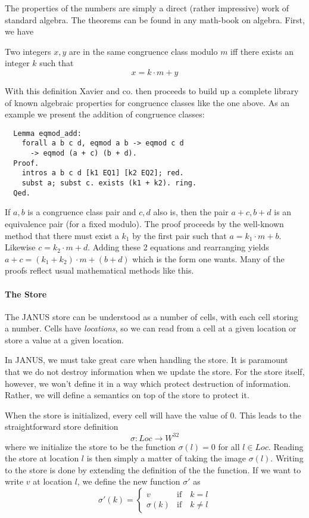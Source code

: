 The properties of the numbers are simply a direct (rather impressive)
work of standard algebra. The theorems can be found in any math-book
on algebra. First, we have
\begin{defn}
  Two integers $x, y$ are in the same congruence class modulo $m$ iff
  there exists an integer $k$ such that
  \begin{equation*}
    x = k \cdot m + y
  \end{equation*}
\end{defn}
With this definition Xavier and co. then proceeds to build up a
complete library of known algebraic properties for congruence classes
like the one above. As an example we present the addition of
congruence classes:
\begin{verbatim}
  Lemma eqmod_add:
    forall a b c d, eqmod a b -> eqmod c d
      -> eqmod (a + c) (b + d).
  Proof.
    intros a b c d [k1 EQ1] [k2 EQ2]; red.
    subst a; subst c. exists (k1 + k2). ring.
  Qed.
\end{verbatim}
If $a, b$ is a congruence class pair and $c, d$ also is, then the pair
$a+c, b+d$ is an equivalence pair (for a fixed modulo). The proof proceeds by the
well-known method that there must exist a $k_1$ by the first pair such
that $a = k_1 \cdot m + b$. Likewise $c = k_2 \cdot m + d$. Adding
these 2 equations and rearranging yields $a + c = (k_1 + k_2) \cdot m
 + (b + d)$ which is the form one wants. Many of the proofs reflect
usual mathematical methods like this.

\paragraph{The Store}

The JANUS store can be understood as a number of cells, with each cell
storing a number. Cells have \emph{locations}, so we can read from a
cell at a given location or store a value at a given location.

In JANUS, we must take great care when handling the store. It is
paramount that we do not destroy information when we update the
store. For the store itself, however, we won't define it in a way
which protect destruction of information. Rather, we will define a
semantics on top of the store to protect it.

When the store is initialized, every cell will have the value of
$0$. This leads to the straightforward store definition
\begin{equation*}
  \sigma \colon Loc \to W^{32}
\end{equation*}
where we initialize the store to be the function $\sigma(l) = 0$ for
all $l \in Loc$. Reading the store at location $l$ is then simply a
matter of taking the image $\sigma(l)$. Writing to the store is done
by extending the definition of the the function. If we want to write
$v$ at location $l$, we define the new function $\sigma'$ as
\begin{equation*}
  \sigma'(k) = \begin{cases}
    v& \text{if}\quad k = l\\
    \sigma(k)&\text{if}\quad k \neq l
    \end{cases}
\end{equation*}

